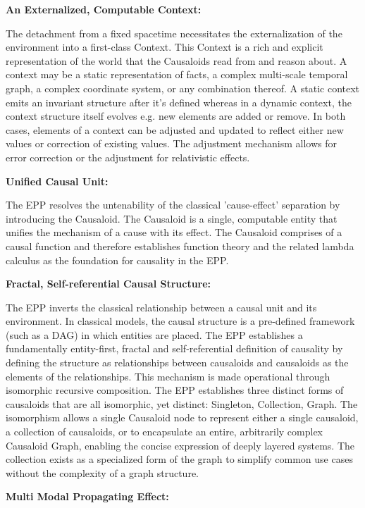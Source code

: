\textbf{An Externalized, Computable Context:} 

The detachment from a fixed spacetime necessitates the externalization of the environment into a first-class Context. This Context is a rich and explicit representation of the world that the Causaloids read from and reason about. A context may be a static representation of facts, a complex multi-scale temporal graph, a complex coordinate system, or any combination thereof. A static context emits an invariant structure after it’s defined whereas in a dynamic context, the context structure itself evolves e.g. new elements are added or remove. In both cases, elements of a context can be adjusted and updated to reflect either new values or correction of existing values. The adjustment mechanism allows for error correction or the adjustment for relativistic effects.   

 \textbf{Unified Causal Unit:} 
 
 The EPP resolves the untenability of the classical 'cause-effect' separation by introducing the Causaloid. The Causaloid is a single, computable entity that unifies the mechanism of a cause with its effect. The Causaloid comprises of a causal function and therefore establishes function theory and the related lambda calculus as the foundation for causality in the EPP. 

\textbf{Fractal, Self-referential Causal Structure:} 

The EPP inverts the classical relationship between a causal unit and its environment. In classical models, the causal structure is a pre-defined framework (such as a DAG) in which entities are placed. The EPP establishes a fundamentally entity-first, fractal and self-referential definition of causality by defining the structure as relationships between causaloids and causaloids as the elements of the relationships. This mechanism is made operational through isomorphic recursive composition. The EPP establishes three distinct forms of causaloids that are all isomorphic, yet distinct: Singleton, Collection, Graph.  The isomorphism allows a single Causaloid node to represent either a single causaloid, a collection of causaloids, or to encapsulate an entire, arbitrarily complex Causaloid Graph, enabling the concise expression of deeply layered systems. The collection exists as a specialized form of the graph to simplify common use cases without the complexity of a graph structure. 


\textbf{Multi Modal Propagating Effect:}
  
